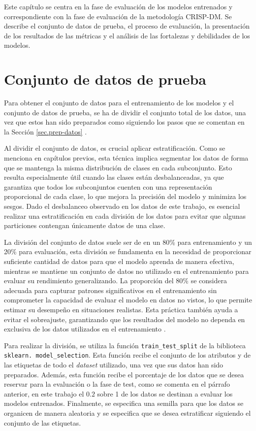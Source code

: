 Este capítulo se centra en la fase de evaluación de los modelos entrenados y correspondiente con la fase de evaluación de la metodología CRISP-DM. Se describe el conjunto de datos de prueba, el proceso de evaluación, la presentación de los resultados de las métricas y el análisis de las fortalezas y debilidades de los modelos.

\section{Conjunto de datos de prueba}
Para obtener el conjunto de datos para el entrenamiento de los modelos y el conjunto de datos de prueba, se ha de dividir el conjunto total de los datos, una vez que estos han sido preparados como siguiendo los pasos que se comentan en la Sección \ref{sec.prep-datos} . 


Al dividir el conjunto de datos, es crucial aplicar estratificación. Como se menciona en capítulos previos, esta técnica implica segmentar los datos de forma que se mantenga la misma distribución de clases en cada subconjunto. Esto resulta especialmente útil cuando las clases están desbalanceadas, ya que garantiza que todos los subconjuntos cuenten con una representación proporcional de cada clase, lo que mejora la precisión del modelo y minimiza los sesgos. Dado el desbalanceo observado en los datos de este trabajo, es esencial realizar una estratificación en cada división de los datos para evitar que algunas particiones contengan únicamente datos de una clase.


La división del conjunto de datos suele ser de en un 80\% para entrenamiento y un 20\% para evaluación, esta división se fundamenta en la necesidad de proporcionar suficiente cantidad de datos para que el modelo aprenda de manera efectiva, mientras se mantiene un conjunto de datos no utilizado en el entrenamiento para evaluar su rendimiento generalizando. La proporción del 80\% se considera adecuada para capturar patrones significativos en el entrenamiento sin comprometer la capacidad de evaluar el modelo en datos no vistos, lo que permite estimar su desempeño en situaciones realistas. Esta práctica también ayuda a evitar el sobreajuste, garantizando que los resultados del modelo no dependa en exclusiva de los datos utilizados en el entrenamiento \cite{bishop2006pattern}.

Para realizar la división, se utiliza la función \texttt{train\_test\_split} de la biblioteca \texttt{sklearn. model\_selection}. Esta función recibe el conjunto de los atributos y de las etiquetas de todo el \textit{dataset} utilizado, una vez que sus datos han sido preparados. Además, esta función recibe el porcentaje de los datos que se desea reservar para la evaluación o la fase de test, como se comenta en el párrafo anterior, en este trabajo el $0.2$ sobre 1 de los datos se destinan a evaluar los modelos entrenados. Finalmente, se especifica una semilla para que los datos se organicen de manera aleatoria y se especifica que se desea estratificar siguiendo el conjunto de las etiquetas.

